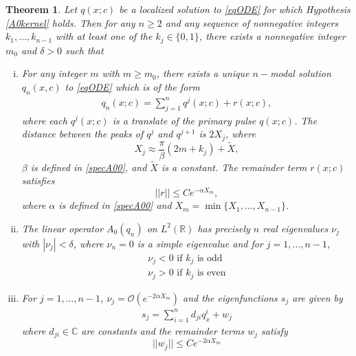 \documentclass[12pt]{article}
\def\R{{\mathbb R}}
\def\C{{\mathbb C}}
\newtheorem{theorem}{Theorem}
\begin{document}
\begin{theorem}\label{multiexist}
Let $q(x; c)$ be a localized solution to \eqref{eqODE} for which Hypothesis \ref{A0kernel} holds. Then for any $n \geq 2$ and any sequence of nonnegative integers $k_1, \dots, k_{n-1}$ with at least one of the $k_j \in \{0, 1 \}$, there exists a nonnegative integer $m_0$ and $\delta > 0$ such that
\begin{enumerate}[(i)]
	\item For any integer $m$ with $m \geq m_0$, there exists a unique $n-$modal solution $q_n(x, c)$ to \eqref{eqODE} which is of the form
	\begin{align}\label{qn}
	q_n(x; c) = \sum_{j = 1}^{n} q^j(x; c) + r(x; c),
	\end{align}
	where each $q^j(x; c)$ is a translate of the primary pulse $q(x; c)$. The distance between the peaks of $q^j$ and $q^{j+1}$ is $2 X_j$, where
	\begin{equation*}
	X_j \approx \frac{\pi}{\beta}(2 m + k_j) + \tilde{X},
	\end{equation*}
	$\beta$ is defined in \eqref{specA00}, and $\tilde{X}$ is a constant. The remainder term $r(x; c)$ satisfies
	\begin{equation}\label{rbound}
	||r|| \leq C e^{-\alpha X_m},
	\end{equation}
	where $\alpha$ is defined in \eqref{specA00} and $X_m = \min\{X_1, \dots, X_{n-1}\}$.

	\item The linear operator $A_0(q_n)$ on $L^2(\R)$ has precisely $n$ real eigenvalues $\nu_j$ with $|\nu_j| < \delta$, where $\nu_n = 0$ is a simple eigenvalue and for $j = 1, \dots, n-1$,
	\begin{align*}
	\nu_j < 0 \text{ if } k_j \text{ is odd} \\
	\nu_j > 0 \text{ if } k_j \text{ is even} 
	\end{align*}

	\item For $j = 1, \dots, n-1$, $\nu_j = \mathcal{O}(e^{-2\alpha X_m})$ and the eigenfunctions $s_j$ are given by
	\begin{align}\label{sj}
	s_j = \sum_{i = 1}^{n} d_{ji} q^i_x + w_j
	\end{align}
	where $d_{ji} \in \C$ are constants and the remainder terms $w_j$ satisfy
	\begin{equation}\label{sjwbound}
	||w_j|| \leq C e^{-2 \alpha X_m}
	\end{equation}

\end{enumerate}


\end{theorem}
\end{document}
